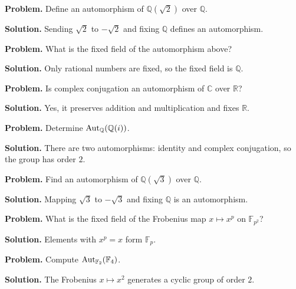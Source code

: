 \begin{example}\label{ex:sec4-1}
\textbf{Problem.} Define an automorphism of $\mathbb{Q}(\sqrt{2})$ over $\mathbb{Q}$.

\textbf{Solution.} Sending $\sqrt{2}$ to $-\sqrt{2}$ and fixing $\mathbb{Q}$ defines an automorphism.
\end{example}

\begin{example}\label{ex:sec4-2}
\textbf{Problem.} What is the fixed field of the automorphism above?

\textbf{Solution.} Only rational numbers are fixed, so the fixed field is $\mathbb{Q}$.
\end{example}

\begin{example}\label{ex:sec4-3}
\textbf{Problem.} Is complex conjugation an automorphism of $\mathbb{C}$ over $\mathbb{R}$?

\textbf{Solution.} Yes, it preserves addition and multiplication and fixes $\mathbb{R}$.
\end{example}

\begin{example}\label{ex:sec4-4}
\textbf{Problem.} Determine $\operatorname{Aut}_{\mathbb{Q}}(\mathbb{Q}(i))$.

\textbf{Solution.} There are two automorphisms: identity and complex conjugation, so the group has order $2$.
\end{example}

\begin{example}\label{ex:sec4-5}
\textbf{Problem.} Find an automorphism of $\mathbb{Q}(\sqrt{3})$ over $\mathbb{Q}$.

\textbf{Solution.} Mapping $\sqrt{3}$ to $-\sqrt{3}$ and fixing $\mathbb{Q}$ is an automorphism.
\end{example}

\begin{example}\label{ex:sec4-6}
\textbf{Problem.} What is the fixed field of the Frobenius map $x\mapsto x^p$ on $\mathbb{F}_{p^2}$?

\textbf{Solution.} Elements with $x^p=x$ form $\mathbb{F}_p$.
\end{example}

\begin{example}\label{ex:sec4-7}
\textbf{Problem.} Compute $\operatorname{Aut}_{\mathbb{F}_2}(\mathbb{F}_4)$.

\textbf{Solution.} The Frobenius $x\mapsto x^2$ generates a cyclic group of order $2$.
\end{example}


